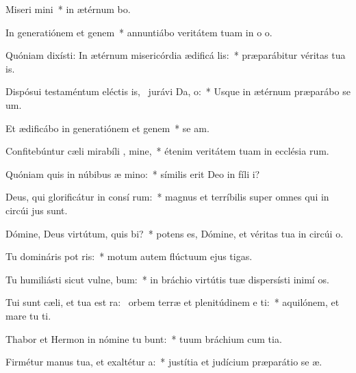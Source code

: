 \item Miseri mini~* in ætérnum bo.
\item In generatiónem et genem~* annuntiábo veritátem tuam in o o.
\item Quóniam dixísti: In ætérnum misericórdia ædificá  lis:~* præparábitur véritas tua  is.
\item Dispósui testaméntum eléctis is,~\pscross{} jurávi Da,  o:~* Usque in ætérnum præparábo se um.
\item Et ædificábo in generatiónem et genem~* se am.
\item Confitebúntur cæli mirabíli , mine,~* étenim veritátem tuam in ecclésia rum.
\item Quóniam quis in núbibus æ mino:~* símilis erit Deo in fíli i?
\item Deus, qui glorificátur in consí rum:~* magnus et terríbilis super omnes qui in circúi jus sunt.
\item Dómine, Deus virtútum, quis  bi?~* potens es, Dómine, et véritas tua in circúi o.
\item Tu domináris pot ris:~* motum autem flúctuum ejus  tigas.
\item Tu humiliásti sicut vulne, bum:~* in bráchio virtútis tuæ dispersísti inimí os.
\item Tui sunt cæli, et tua est ra:~\pscross{} orbem terræ et plenitúdinem e  ti:~* aquilónem, et mare tu ti.
\item Thabor et Hermon in nómine tu bunt:~* tuum bráchium cum tia.
\item Firmétur manus tua, et exaltétur  a:~* justítia et judícium præparátio se æ.
